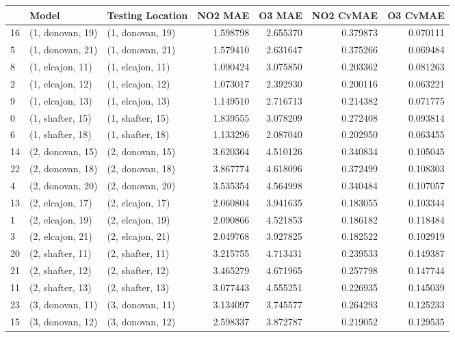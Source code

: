 \begin{tabular}{lllrrrr}
\toprule
{} &             Model &  Testing Location &   NO2 MAE &    O3 MAE &  NO2 CvMAE &  O3 CvMAE \\
\midrule
16 &  (1, donovan, 19) &  (1, donovan, 19) &  1.598798 &  2.655370 &   0.379873 &  0.070111 \\
5  &  (1, donovan, 21) &  (1, donovan, 21) &  1.579410 &  2.631647 &   0.375266 &  0.069484 \\
8  &  (1, elcajon, 11) &  (1, elcajon, 11) &  1.090424 &  3.075850 &   0.203362 &  0.081263 \\
2  &  (1, elcajon, 12) &  (1, elcajon, 12) &  1.073017 &  2.392930 &   0.200116 &  0.063221 \\
9  &  (1, elcajon, 13) &  (1, elcajon, 13) &  1.149510 &  2.716713 &   0.214382 &  0.071775 \\
0  &  (1, shafter, 15) &  (1, shafter, 15) &  1.839555 &  3.078209 &   0.272408 &  0.093814 \\
6  &  (1, shafter, 18) &  (1, shafter, 18) &  1.133296 &  2.087040 &   0.202950 &  0.063455 \\
14 &  (2, donovan, 15) &  (2, donovan, 15) &  3.620364 &  4.510126 &   0.340834 &  0.105045 \\
22 &  (2, donovan, 18) &  (2, donovan, 18) &  3.867774 &  4.618096 &   0.372499 &  0.108303 \\
4  &  (2, donovan, 20) &  (2, donovan, 20) &  3.535354 &  4.564998 &   0.340484 &  0.107057 \\
13 &  (2, elcajon, 17) &  (2, elcajon, 17) &  2.060804 &  3.941635 &   0.183055 &  0.103344 \\
1  &  (2, elcajon, 19) &  (2, elcajon, 19) &  2.090866 &  4.521853 &   0.186182 &  0.118484 \\
3  &  (2, elcajon, 21) &  (2, elcajon, 21) &  2.049768 &  3.927825 &   0.182522 &  0.102919 \\
20 &  (2, shafter, 11) &  (2, shafter, 11) &  3.215755 &  4.713431 &   0.239533 &  0.149387 \\
21 &  (2, shafter, 12) &  (2, shafter, 12) &  3.465279 &  4.671965 &   0.257798 &  0.147744 \\
11 &  (2, shafter, 13) &  (2, shafter, 13) &  3.077443 &  4.555251 &   0.226935 &  0.145039 \\
23 &  (3, donovan, 11) &  (3, donovan, 11) &  3.134097 &  3.745577 &   0.264293 &  0.125233 \\
15 &  (3, donovan, 12) &  (3, donovan, 12) &  2.598337 &  3.872787 &   0.219052 &  0.129535 \\

\end{tabular}
